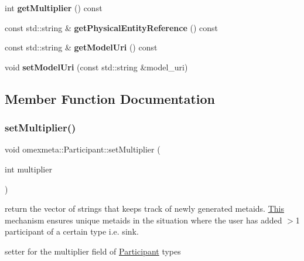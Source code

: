 \begin{DoxyCompactItemize}
int {\bfseries get\+Multiplier} () const
\item 
\mbox{\label{classomexmeta_1_1Participant_a40a5858db6aaae7ec7095b320de838d1}} 
const std\+::string \& {\bfseries get\+Physical\+Entity\+Reference} () const
\item 
\mbox{\label{classomexmeta_1_1Participant_ae78613f8d39ccfc23fc3624deb960fb0}} 
const std\+::string \& {\bfseries get\+Model\+Uri} () const
\item 
\mbox{\label{classomexmeta_1_1Participant_abea74e8605f7314a51db8dc723961462}} 
void {\bfseries set\+Model\+Uri} (const std\+::string \&model\+\_\+uri)
\end{DoxyCompactItemize}


\subsection{Member Function Documentation}
\mbox{\label{classomexmeta_1_1Participant_a97c047d67dc86db1e617c3528bf8035e}} 
\subsubsection{\texorpdfstring{set\+Multiplier()}{setMultiplier()}}
{\footnotesize\ttfamily void omexmeta\+::\+Participant\+::set\+Multiplier (\begin{DoxyParamCaption}\item[{int}]{multiplier }\end{DoxyParamCaption})}



return the vector of strings that keeps track of newly generated metaids. \hyperlink{classThis}{This} mechanism ensures unique metaids in the situation where the user has added $>$1 participant of a certain type i.\+e. sink. 

setter for the multiplier field of \hyperlink{classomexmeta_1_1Participant}{Participant} types \mbox{\label{classomexmeta_1_1Participant_a415c1205762dff6943426d830d74edcd}} 
